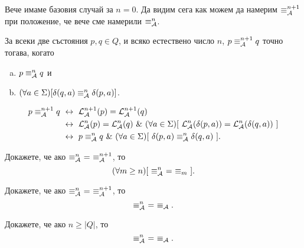 Вече имаме базовия случай за $n=0$.
Да видим сега как можем да намерим $\equiv^{n+1}_{\mathcal{A}}$ при положение, че вече сме намерили $\equiv^n_{\mathcal{A}}$.
\begin{framed}
  \begin{proposition}
    \label{pr:one-letter-test}
    За всеки две състояния $p,q \in Q$, и всяко естествено число $n$, $p \equiv^{n+1}_{\mathcal{A}} q$ точно тогава, когато
    \begin{enumerate}[a)]
    \item
      $p \equiv^n_{\mathcal{A}} q$ и
    \item
      $(\forall a \in \Sigma)[\delta(q,a) \equiv^n_{\mathcal{A}} \delta(p,a)]$.
    \end{enumerate}
  \end{proposition}  
\end{framed}
\begin{hint}
  \begin{align*}
    p \equiv^{n+1}_\A q & \iff \L^{n+1}_\A(p) = \L^{n+1}_\A(q)\\
                     & \iff \L^n_\A(p) = \L^n_\A(q)\ \&\ (\forall a \in \Sigma)[\ \L^n_\A(\delta(p,a)) = \L^n_\A(\delta(q,a))\ ]\\
                     & \iff p \equiv^n_\A q\ \&\ (\forall a \in \Sigma)[\ \delta(p,a) \equiv^n_\A \delta(q,a)\ ].
  \end{align*}
\end{hint}

\begin{problem}
  Докажете, че ако $\equiv^n_\A\ =\ \equiv^{n+1}_\A$, то
  \[(\forall m \geq n)[\ \equiv^n_{\mathcal{A}}\ =\ \equiv_m\ ].\]
\end{problem}

\begin{problem}
  Докажете, че ако $\equiv^n_\A\ =\ \equiv^{n+1}_\A$, то
  \[\equiv^n_\A\ =\ \equiv_\A.\]
\end{problem}

\begin{problem}
  Докажете, че ако $n \geq |Q|$, то
  \[\equiv^n_\A\ =\ \equiv_\A.\]
\end{problem}



